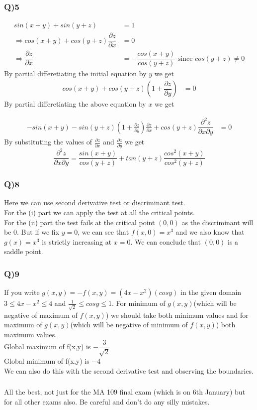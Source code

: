 \documentclass[11pt]{beamer}
\begin{document}
\begin{frame}
\frametitle{Q)5}
\begin{align*}
sin(x+y)+sin(y+z)&=1\\
\Rightarrow cos(x+y)+cos(y+z)\dfrac{\partial z}{\partial x}&=0\\
\Rightarrow \dfrac{\partial z}{\partial x}&=-\dfrac{cos(x+y)}{cos(y+z)}\text{ since $cos(y+z)\neq 0$}
\end{align*}
By partial differetiating the initial equation by $y$ we get
\begin{align*}
cos(x+y)+cos(y+z)\left(1+\dfrac{\partial z}{\partial y}\right)&=0
\end{align*}
By partial differetiating the above equation by $x$ we get
\end{frame}
\begin{frame}
\begin{align*}
-sin(x+y)-sin(y+z)\left(1+\frac{\partial z}{\partial y} \right)\frac{\partial z}{\partial x}+cos(y+z)\dfrac{\partial^2 z}{\partial x\partial y} &=0
\end{align*}
By substituting the values of $\frac{\partial z}{\partial x}$ and $\frac{\partial z}{\partial y}$ we get
$$\dfrac{\partial^2 z}{\partial x\partial y}=\dfrac{sin(x+y)}{cos(y+z)}+tan(y+z)\dfrac{cos^2(x+y)}{cos^2(y+z)}$$
\end{frame}
\begin{frame}
\frametitle{Q)8}
Here we can use second derivative test or discriminant test.\\
For the (i) part we can apply the test at all the critical points.\\
For the (ii) part the test fails at the critical point $(0,0)$ as the discriminant will be 0. But if we fix $y=0$, we can see that $f(x,0)=x^3$ and we also know that $g(x)=x^3$ is strictly increasing at $x=0$. We can conclude that $(0,0)$ is a saddle point. 
\end{frame}
\begin{frame}
\frametitle{Q)9}
If you write $g(x,y)=-f(x,y)=(4x-x^2)(cos y)$ in the given domain $3\leq4x-x^2\leq 4$ and $\frac{1}{\sqrt{2}}\leq cosy\leq 1$. For minimum of $g(x,y)$(which will be negative of maximum of $f(x,y)$) we should take both minimum values and for maximum of $g(x,y)$(which will be negative of minimum of $f(x,y)$) both maximum values.\\ 
Global maximum of f(x,y) is $-\dfrac{3}{\sqrt{2}}$\\
Global minimum of f(x,y) is $-4$\\
We can also do this with the second derivative test and observing the boundaries.
\end{frame}
\begin{frame}
\frametitle{}
All the best, not just for the MA 109 final exam (which is on 6th January) but for all other exams also. Be careful and don't do any silly mistakes.
\end{frame}
\end{document}
